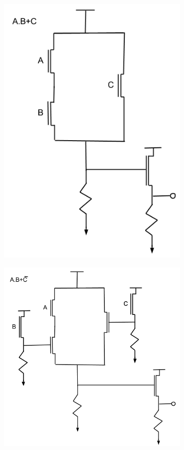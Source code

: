 {\begin{solution}
\begin{figure}[h!]
\begin{subfigure}[H]{0.4\textwidth}
				\includegraphics[width=\textwidth]{images/solution433.png}
			\end{subfigure}
			\begin{subfigure}[H]{0.4\textwidth}
				\includegraphics[width=\textwidth]{images/solution434.png}

\end{subfigure}
\end{figure}
\end{solution}}
